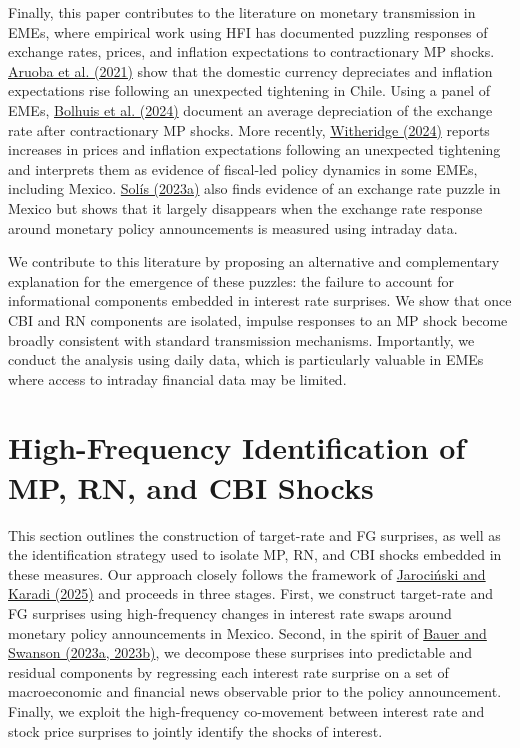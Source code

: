 \documentclass[12pt, reqno]{article}
\begin{document}
Finally, this paper contributes to the literature on monetary transmission in EMEs, where empirical work using HFI has documented puzzling responses of exchange rates, prices, and inflation expectations to contractionary MP shocks. \hyperlink{Aruoba et al. (2021)}{Aruoba et al. (2021)} show that the domestic currency depreciates and inflation expectations rise following an unexpected tightening in Chile. Using a panel of EMEs, \hyperlink{Bolhuis et al. (2024)}{Bolhuis et al. (2024)} document an average depreciation of the exchange rate after contractionary MP shocks. More recently, \hyperlink{Witheridge (2024)}{Witheridge (2024)} reports increases in prices and inflation expectations following an unexpected tightening and interprets them as evidence of fiscal-led policy dynamics in some EMEs, including Mexico. \hyperlink{Solís (2023a)}{Solís (2023a)} also finds evidence of an exchange rate puzzle in Mexico but shows that it largely disappears when the exchange rate response around monetary policy announcements is measured using intraday data.

We contribute to this literature by proposing an alternative and complementary explanation for the emergence of these puzzles: the failure to account for informational components embedded in interest rate surprises. We show that once CBI and RN components are isolated, impulse responses to an MP shock become broadly consistent with standard transmission mechanisms. Importantly, we conduct the analysis using daily data, which is particularly valuable in EMEs where access to intraday financial data may be limited.





\section{High-Frequency Identification of MP, RN, and CBI Shocks}
\hypertarget{Section 3}{}

This section outlines the construction of target-rate and FG surprises, as well as the identification strategy used to isolate MP, RN, and CBI shocks embedded in these measures. Our approach closely follows the framework of \hyperlink{Jarociński and Karadi (2025)}{Jarociński and Karadi (2025)} and proceeds in three stages. First, we construct target-rate and FG surprises using high-frequency changes in interest rate swaps around monetary policy announcements in Mexico. Second, in the spirit of \hyperlink{Bauer and Swanson (2023a, 2023b)}{Bauer and Swanson (2023a, 2023b)}, we decompose these surprises into predictable and residual components by regressing each interest rate surprise on a set of macroeconomic and financial news observable prior to the policy announcement. Finally, we exploit the high-frequency co-movement between interest rate and stock price surprises to jointly identify the shocks of interest.
\end{document}
